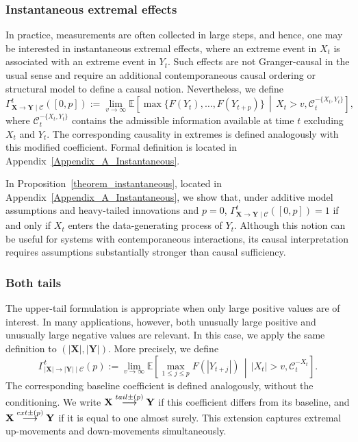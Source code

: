 \documentclass[a4paper,11pt]{article}
\newcommand{\toverset}[2]{\overset{{\rm #1}}{#2}}
\begin{document}
\subsubsection{Instantaneous extremal effects}
In practice, measurements are often collected in large steps, and hence, one may be interested in instantaneous extremal effects, where an extreme event in \(X_t\) is associated with an extreme event in \(Y_t\). Such effects are not Granger-causal in the usual sense and require an additional contemporaneous causal ordering or structural model to define a causal notion. Nevertheless, we define
\[
\Gamma^{t}_{\mathbf X\to \mathbf Y\mid\mathcal C}([0,p])
:=
\lim_{v\to\infty}
\mathbb E\!\left[
\max\{F(Y_t), \dots, F(Y_{t+p})\}
\,\middle|\,
X_t>v,\mathcal C^{-\{X_t,Y_t\}}_t
\right],
\]
where \(\mathcal C^{-\{X_t,Y_t\}}_t\) contains the admissible information available at time \(t\) excluding \(X_t\) and \(Y_t\). The corresponding causality in extremes is defined analogously with this modified coefficient. Formal definition is located in Appendix~\ref{Appendix_A_Instantaneous}. 

In Proposition~\ref{theorem_instantaneous}, located in Appendix~\ref{Appendix_A_Instantaneous}, we show that, under additive model assumptions and heavy-tailed innovations and $p=0$, $\Gamma^{t}_{\mathbf X\to \mathbf Y\mid\mathcal C}([0, p]) = 1$ if and only if $X_t$ enters the data-generating process of $Y_t$. Although this notion can be useful for systems with contemporaneous interactions, its causal interpretation requires assumptions substantially stronger than causal sufficiency. 

\subsubsection{Both tails}
The upper-tail formulation is appropriate when only large positive values are of interest. In many applications, however, both unusually large positive and unusually large negative values are relevant. In this case, we apply the same definition to \((|\mathbf X|,|\mathbf Y|)\). More precisely, we define
\[
\Gamma^t_{|\mathbf X|\to |\mathbf Y|\mid\mathcal C}(p)
:=
\lim_{v\to\infty}
\mathbb E\!\left[
\max_{1\le j\le p} F(|Y_{t+j}|)
\,\middle|\,
|X_t|>v,\mathcal C^{-X_t}_t
\right].
\]
The corresponding baseline coefficient is defined analogously, without the conditioning. We write
\(\mathbf{X}\toverset{tail\pm(p)}{\longrightarrow}\mathbf{Y}\) if this coefficient differs from its baseline, and
\(\mathbf{X}\toverset{ext\pm(p)}{\longrightarrow}\mathbf{Y}\) if it is equal to one almost surely. This extension captures extremal up-movements and down-movements simultaneously.
\end{document}
